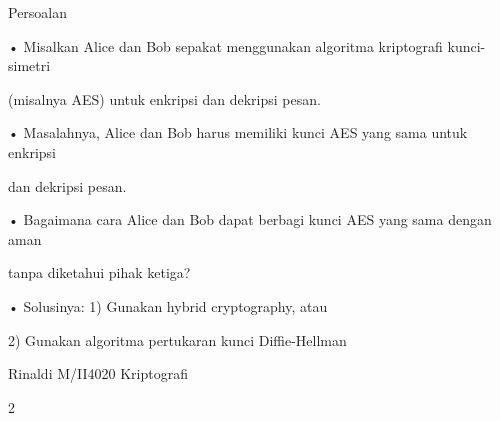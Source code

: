 \documentclass{article}
\begin{document}

Persoalan

• Misalkan Alice dan Bob sepakat menggunakan algoritma kriptografi kunci-simetri 

(misalnya AES) untuk enkripsi dan dekripsi pesan.

• Masalahnya, Alice dan Bob harus memiliki kunci AES yang sama untuk enkripsi 

dan dekripsi pesan.

• Bagaimana cara Alice dan Bob dapat berbagi kunci AES yang sama dengan aman 

tanpa diketahui pihak ketiga?

• Solusinya:  1) Gunakan hybrid cryptography, atau

                       2)  Gunakan algoritma pertukaran kunci Diffie-Hellman

Rinaldi M/II4020 Kriptografi

2
\end{document}
